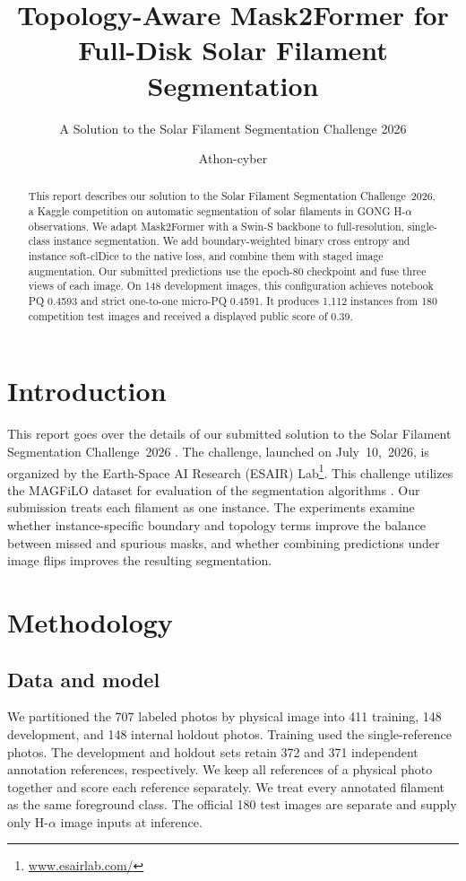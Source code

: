 \documentclass[sigconf]{acmart}
\begin{document}
\title{Topology-Aware Mask2Former for Full-Disk Solar Filament Segmentation}
\subtitle{A Solution to the Solar Filament Segmentation Challenge 2026}
\author{Athon-cyber}

\begin{abstract}
This report describes our solution to the Solar Filament Segmentation Challenge~2026, a Kaggle competition on automatic segmentation of solar filaments in GONG H-$\alpha$ observations. We adapt Mask2Former with a Swin-S backbone to full-resolution, single-class instance segmentation. We add boundary-weighted binary cross entropy and instance soft-clDice to the native loss, and combine them with staged image augmentation. Our submitted predictions use the epoch-80 checkpoint and fuse three views of each image. On 148 development images, this configuration achieves notebook PQ 0.4593 and strict one-to-one micro-PQ 0.4591. It produces 1,112 instances from 180 competition test images and received a displayed public score of 0.39.
\end{abstract}
\maketitle

\section{Introduction}
This report goes over the details of our submitted solution to the Solar Filament Segmentation Challenge~2026 \cite{filament-segmentation-2026}. The challenge, launched on July~10,~2026, is organized by the Earth-Space AI Research (ESAIR) Lab\footnote{\href{https://www.esairlab.com/home}{www.esairlab.com/}}. This challenge utilizes the MAGFiLO dataset for evaluation of the segmentation algorithms \cite{ahmadzadeh2024dataset}.
Our submission treats each filament as one instance. The experiments examine whether instance-specific boundary and topology terms improve the balance between missed and spurious masks, and whether combining predictions under image flips improves the resulting segmentation.

\newpage
\section{Methodology}\label{sec:methodology}
\subsection{Data and model}
We partitioned the 707 labeled photos by physical image into 411 training, 148 development, and 148 internal holdout photos. Training used the single-reference photos. The development and holdout sets retain 372 and 371 independent annotation references, respectively. We keep all references of a physical photo together and score each reference separately. We treat every annotated filament as the same foreground class. The official 180 test images are separate and supply only H-$\alpha$ image inputs at inference.
\end{document}
